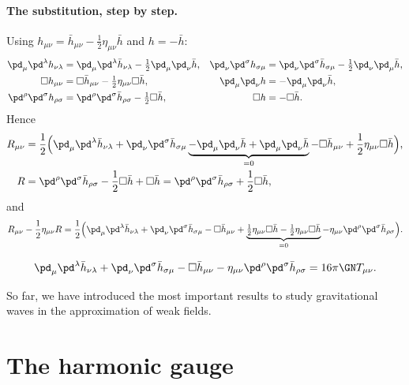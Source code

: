 \paragraph{The substitution, step by step.} Using $h_{\mu\nu}=\bar h_{\mu\nu}-\frac12\eta_{\mu\nu}\bar h$ and $h=-\bar h$:
\begin{align*}
  \pd_\mu\pd^\lambda h_{\nu\lambda}&=\pd_\mu\pd^\lambda\bar h_{\nu\lambda}-\tfrac12\pd_\mu\pd_\nu\bar h, &
  \pd_\nu\pd^\sigma h_{\sigma\mu}&=\pd_\nu\pd^\sigma\bar h_{\sigma\mu}-\tfrac12\pd_\nu\pd_\mu\bar h,\\
  \Box h_{\mu\nu}&=\Box\bar h_{\mu\nu}-\tfrac12\eta_{\mu\nu}\Box\bar h, &
  \pd_\mu\pd_\nu h&=-\pd_\mu\pd_\nu\bar h,\\
  \pd^\rho\pd^\sigma h_{\rho\sigma}&=\pd^\rho\pd^\sigma\bar h_{\rho\sigma}-\tfrac12\Box\bar h, &
  \Box h&=-\Box\bar h .
\end{align*}
Hence
\begin{align*}
  R_{\mu\nu}&=\frac12\Big(\pd_\mu\pd^\lambda\bar h_{\nu\lambda}+\pd_\nu\pd^\sigma\bar h_{\sigma\mu}\underbrace{-\pd_\mu\pd_\nu\bar h+\pd_\mu\pd_\nu\bar h}_{=0}-\Box\bar h_{\mu\nu}+\frac12\eta_{\mu\nu}\Box\bar h\Big),\\
  R&=\pd^\rho\pd^\sigma\bar h_{\rho\sigma}-\frac12\Box\bar h+\Box\bar h=\pd^\rho\pd^\sigma\bar h_{\rho\sigma}+\frac12\Box\bar h ,
\end{align*}
and
\[
  R_{\mu\nu}-\frac12\eta_{\mu\nu}R=\frac12\Big(\pd_\mu\pd^\lambda\bar h_{\nu\lambda}+\pd_\nu\pd^\sigma\bar h_{\sigma\mu}-\Box\bar h_{\mu\nu}+\underbrace{\tfrac12\eta_{\mu\nu}\Box\bar h-\tfrac12\eta_{\mu\nu}\Box\bar h}_{=0}-\eta_{\mu\nu}\pd^\rho\pd^\sigma\bar h_{\rho\sigma}\Big).
\]
\begin{keyresult}
\begin{equation}
  \pd_\mu\pd^\lambda\bar h_{\nu\lambda}+\pd_\nu\pd^\sigma\bar h_{\sigma\mu}-\Box\bar h_{\mu\nu}-\eta_{\mu\nu}\pd^\rho\pd^\sigma\bar h_{\rho\sigma}=16\pi\GN T_{\mu\nu}.
  \label{eq:lin-efe}
\end{equation}
\end{keyresult}
So far, we have introduced the most important results to study gravitational waves in the approximation of weak fields.

\section{The harmonic gauge}

